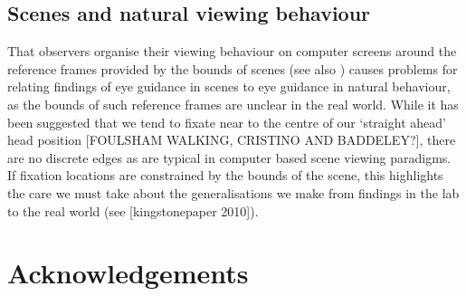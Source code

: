 \documentclass[a4paper, twocolumn, oneside, 11pt]{article}
\begin{document}
\subsection{Scenes and natural viewing behaviour}
That observers organise their viewing behaviour on computer screens around the reference frames provided by the bounds of scenes (see also \cite{Stainer:2013ce}) causes problems for relating findings of eye guidance in scenes to eye guidance in natural behaviour, as the bounds of such reference frames are unclear in the real world. While it has been suggested that we tend to fixate near to the centre of our `straight ahead' head position [FOULSHAM WALKING, CRISTINO AND BADDELEY?], there are no discrete edges as are typical in computer based scene viewing paradigms. If fixation locations are constrained by the bounds of the scene, this highlights the care we must take about the generalisations we make from findings in the lab to the real world (see [kingstonepaper 2010]). 


\section*{Acknowledgements}


\appendix



\small

\end{document}
